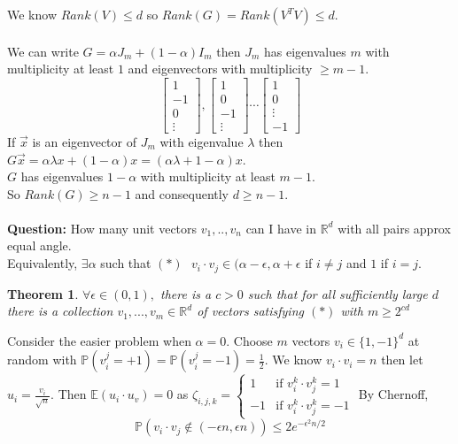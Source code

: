 \documentclass[a4paper]{article}
\newtheorem{thm}{Theorem}[section]
\begin{document}
We know $Rank(V)\leq d$ so $Rank(G)=Rank(V^TV)\leq d.$\\\\
We can write $G=\alpha J_m+(1-\alpha)I_m$ then $J_m$ has eigenvalues $m$ with multiplicity at least $1$ and eigenvectors with multiplicity $\geq m-1.$
$$\begin{bmatrix}1\\ -1 \\ 0 \\ \vdots\end{bmatrix}, \begin{bmatrix}1\\ 0 \\ -1 \\ \vdots\end{bmatrix}\cdots \begin{bmatrix}1\\ 0 \\ \vdots\\ -1\end{bmatrix}
$$
If $\Vec{x}$ is an eigenvector of $J_m$ with eigenvalue $\lambda$ then $G\Vec{x}=\alpha \lambda x+(1-\alpha)x=(\alpha\lambda +1-\alpha)x.$\\
$G$ has eigenvalues $1-\alpha$ with multiplicity at least $m-1.$\\
So $Rank(G)\geq n-1$ and consequently $d\geq n-1.$\\\\
\textbf{Question: } How many unit vectors $v_1,..,v_n$ can I have in $\mathbb{R}^d$ with all pairs approx equal angle.\\
Equivalently, $\exists \alpha$ such that $(*) \text{ }v_i\cdot v_j\in (\alpha - \epsilon, \alpha + \epsilon$ if $i\neq j$ and $1$ if $i=j.$
\begin{thm}
    $\forall \epsilon\in (0,1),$ there is a $c>0$ such that for all sufficiently large $d$ there is a collection $v_1,...,v_m\in \mathbb{R}^d$ of vectors satisfying $(*)$ with $m\geq 2^{cd}$
\end{thm}
\noindent Consider the easier problem when $\alpha=0.$ Choose $m$ vectors $v_i\in \{1,-1\}^d$ at random with $\mathbb{P}(v_i^j=+1)=\mathbb{P}(v_i^j=-1)=\frac{1}{2}.$
We know $v_i\cdot v_i=n$ then let $u_i=\frac{v_i}{\sqrt{n}}.$
Then $\mathbb{E}(u_i\cdot u_v)=0$ as $\zeta_{i,j,k}=\begin{cases}
    1 & \text{if } v_i^k\cdot v_j^k=1 \\ -1 & \text{if } v_i^k\cdot v_j^k=-1  
\end{cases}$
By Chernoff,
$$\mathbb{P}(v_i\cdot v_j \notin (-\epsilon n, \epsilon n))\leq 2e^{-\epsilon^2n/2}$$
\end{document}
